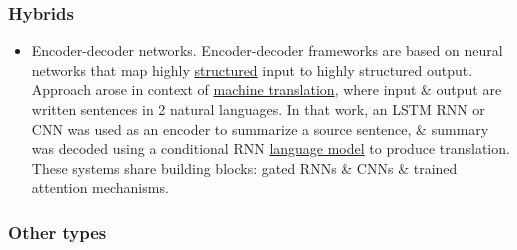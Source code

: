 \documentclass{article}
\begin{document}
\subsubsection{Hybrids}

\begin{itemize}
	\item {\sf Encoder-decoder networks.} Encoder-decoder frameworks are based on neural networks that map highly \href{https://en.wikipedia.org/wiki/Structured_prediction}{structured} input to highly structured output. Approach arose in context of \href{https://en.wikipedia.org/wiki/Machine_translation}{machine translation}, where input \& output are written sentences in 2 natural languages. In that work, an LSTM RNN or CNN was used as an encoder to summarize a source sentence, \& summary was decoded using a conditional RNN \href{https://en.wikipedia.org/wiki/Language_model}{language model} to produce translation. These systems share building blocks: gated RNNs \& CNNs \& trained attention mechanisms.
\end{itemize}

\subsubsection{Other types}
\end{document}
